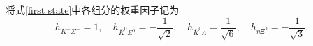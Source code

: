 将式\eqref{first state}中各组分的权重因子记为
\begin{equation}
	\label{eqehi}
	h_{K^{-}\Sigma^{+}}=1,\quad h_{\bar{K}^{0}\Sigma^{0}}=-\frac{1}{\sqrt{2}},\quad h_{\bar{K}^{0}\Lambda}=\frac{1}{\sqrt{6}},\quad h_{\eta\Xi^{0}}=-\frac{1}{\sqrt{3}}.
\end{equation}
